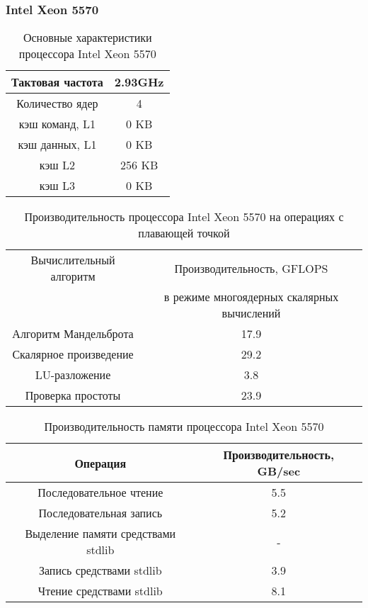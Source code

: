 \subsubsection{Intel Xeon 5570}

\begin{table}[ht]
	\begin{center}
		\caption{Основные характеристики процессора Intel Xeon  5570}
		\begin{tabular}{|c|c|}
			\hline	
			Тактовая частота & 2.93GHz   \\ \hline
			Количество ядер & 4 	     \\ \hline
			кэш команд, L1 &  0 KB      \\ \hline
			кэш данных, L1 &  0 KB       \\ \hline
			кэш L2         &  256 KB      \\ \hline
			кэш L3         &  0 KB        \\ \hline
		\end{tabular}
	\end{center} 	
\end{table} 	

\begin{table}[ht]
	\begin{center}
		\caption{Производительность процессора Intel Xeon  5570 на операциях с плавающей точкой}
		\begin{tabular}{|c|c|}
			\hline	
			Вычислительный алгоритм &  Производительность, GFLOPS \\ 
			& в режиме многоядерных скалярных вычислений \\ \hline
			Алгоритм Мандельброта  &  17.9 	\\ \hline
			Скалярное произведение &  29.2   \\ \hline
			LU-разложение          &  3.8  \\ \hline
			Проверка простоты      &  23.9  \\ \hline 
			
			
		\end{tabular}
	\end{center} 	
\end{table} 	

\begin{table}[ht]
	\begin{center}
		\caption{Производительность памяти процессора Intel Xeon 5570}
		\begin{tabular}{|c|c|}
			\hline	
			Операция  &  Производительность, GB/sec \\ \hline
			Последовательное чтение &  5.5 	\\  \hline
			Последовательная запись &  5.2   \\  \hline
			Выделение памяти средствами stdlib &  -  \\  \hline
			Запись средствами stdlib  & 3.9  \\ \hline
			Чтение средствами stdlib  & 8.1  \\ \hline 
		\end{tabular}
	\end{center} 	
\end{table} 	


